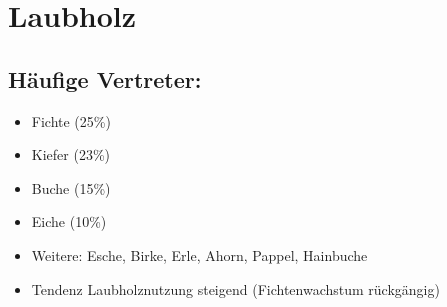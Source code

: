 \documentclass[fleqn,twoside]{article}
\begin{document}
\begin{itemize}
    \end{itemize}



\newpage
\section{Laubholz}

    \subsection{Häufige Vertreter:}
        \begin{itemize}
            \item Fichte (25\%)
            \item Kiefer (23\%)
            \item Buche (15\%)
            \item Eiche (10\%)
            \item Weitere: Esche, Birke, Erle, Ahorn, Pappel, Hainbuche
            \item Tendenz Laubholznutzung steigend (Fichtenwachstum rückgängig)
        \end{itemize}
\end{document}
